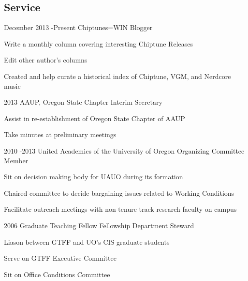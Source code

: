\documentclass[10pt]{article} %
\begin{document}
\begin{itemize-noindent}
\begin{itemize-noindent}

\section{Service}

\job
{December 2013 -}{Present}
{Chiptunes=WIN}
{Blogger}

\begin{itemize-noindent}
\item{Write a monthly column covering interesting Chiptune Releases}
\item{Edit other author's columns}
\item{Created and help curate a historical index of Chiptune, VGM, and Nerdcore music}
\end{itemize-noindent}

\job
{2013}
{AAUP, Oregon State Chapter}
{Interim Secretary}

\begin{itemize-noindent}
\item{Assist in re-establishment of Oregon State Chapter of AAUP}
\item{Take minutes at preliminary meetings}
\end{itemize-noindent}

\job
{2010 -}{2013}
{United Academics of the University of Oregon}
{Organizing Committee Member}

\begin{itemize-noindent}
\item{Sit on decision making body for UAUO during its formation}
\item{Chaired committee to decide bargaining issues related to Working Conditions}
\item{Facilitate outreach meetings with non-tenure track research faculty on campus}
\end{itemize-noindent}

\job
{2006}
{Graduate Teaching Fellow Fellowship}
{Department Steward}

\begin{itemize-noindent}
\item{Liason between GTFF and UO's CIS graduate students}
\item{Serve on GTFF Executive Committee}
\item{Sit on Office Conditions Committee}
\end{itemize-noindent}


\end{itemize-noindent}
\end{itemize-noindent}
\end{document}
